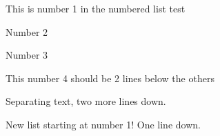 \documentclass[letterpaper,portrait,12pt]{article}
\begin{document}
\setlength{\oddsidemargin}{0.7874in-1in}
\setlength{\textwidth}{\paperwidth - 0.7874in-0.7874in}

	This is number 1 in the numbered list test


	Number 2


	Number 3








	This number 4 should be 2 lines below the others








Separating text, two more lines down.





	New list starting at number 1! One line down.
\end{document}
